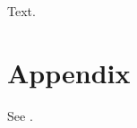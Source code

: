 \documentclass{article}
\begin{document}
Text.
{\small


}
\section{Appendix}
See \cite{arora}.
\end{document}
